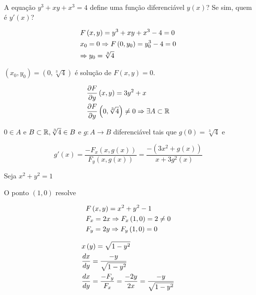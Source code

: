 \documentclass{book}
\begin{document}
\begin{ex}
    A equa\c c\~ao $y^3  + xy + x^3  = 4$ define uma fun\c c\~ao diferenci\'avel $y(x)$? Se sim, quem \'e $y'(x)$?
\end{ex}

\begin{sol}
\[
\begin{gathered}
F\left( {x,y} \right) = y^3  + xy + x^3  - 4 = 0 \hfill \\
x_0  = 0 \Rightarrow F\left( {0,y_0 } \right) = y_0^3  - 4 = 0 \hfill \\
\Rightarrow y_0  = \sqrt[3]{4} \hfill \\
\end{gathered}
\]

$\left( {x_0 ,y_0 } \right) = \left( {0,\sqrt[3]{4}} \right)$ \'e solu\c c\~ao de $F\left( {x,y} \right) = 0$.

\[
\begin{gathered}
\frac{{\partial F}}
{{\partial y}}\left( {x,y} \right) = 3y^2  + x \hfill \\
\frac{{\partial F}}
{{\partial y}}\left( {0,\sqrt[3]{4}} \right) \ne 0 \Rightarrow \exists A \subset \R \hfill \\
\end{gathered}
\]

$0 \in A$ e $B \subset \mathbb{R},\sqrt[3]{4} \in B$ e $g:A \to B$ diferenci\'avel tais que $g\left( 0 \right) = \sqrt[3]{4}$ e

\[
g'\left( x \right) = \frac{{ - F_x \left( {x,g\left( x \right)} \right)}}
{{F_y \left( {x,g\left( x \right)} \right)}} = \frac{{ - \left( {3x^2  + g\left( x \right)} \right)}}
{{x + 3g^2 \left( x \right)}}
\]

\end{sol}

\begin{ex}
Seja $x^2  + y^2  = 1$
\end{ex}

\begin{sol}
O ponto $(1,0)$ resolve

\[
\begin{gathered}
F\left( {x,y} \right) = x^2  + y^2  - 1 \hfill \\
F_x  = 2x \Rightarrow F_x \left( {1,0} \right) = 2 \ne 0 \hfill \\
F_y  = 2y \Rightarrow F_y \left( {1,0} \right) = 0 \hfill \\
\end{gathered}
\]


\[
\begin{gathered}
x\left( y \right) = \sqrt {1 - y^2 }  \hfill \\
\frac{{dx}}
{{dy}} = \frac{{ - y}}
{{\sqrt {1 - y^2 } }} \hfill \\
\frac{{dx}}
{{dy}} = \frac{{ - F_y }}
{{F_x }} = \frac{{ - 2y}}
{{2x}} = \frac{{ - y}}
{{\sqrt {1 - y^2 } }} \hfill \\
\end{gathered}
\]

\end{sol}
\end{document}
